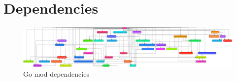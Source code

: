 \section{Dependencies}\label{app:gomod_dependencies}

\begin{figure}[H]
    \centering
    \includegraphics[width=\linewidth*2,angle=90,origin=c]{images/diagrams/gomod-dependency-graph.png}
    \caption{Go mod dependencies}
    \label{fig:gomod_dependencies}
\end{figure}